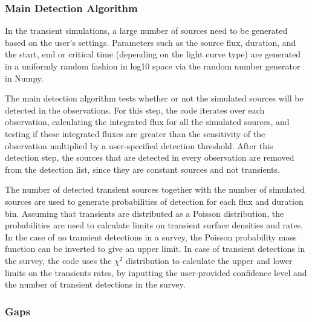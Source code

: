 \documentclass[12pt]{article}
\begin{document}
\subsubsection{Main Detection Algorithm}

In the transient simulations, a large number of sources need to be generated based on the user's settings. Parameters such as the source flux, duration, and the start, end or critical time (depending on the light curve type) are generated in a uniformly random fashion in log10 space via the random number generator in Numpy. 

The main detection algorithm tests whether or not the simulated sources will be detected in the observations. For this step, the code iterates over each observation, calculating the integrated flux for all the simulated sources, and testing if these integrated fluxes are greater than the sensitivity of the observation multiplied by a user-specified detection threshold. After this detection step, the sources that are detected in every observation are removed from the detection list, since they are constant sources and not transients. 

The number of detected transient sources together with the number of simulated sources are used to generate probabilities of detection for each flux and duration bin. Assuming that transients are distributed as a Poisson distribution, the probabilities are used to calculate limits on transient surface densities and rates. In the case of no transient detections in a survey, the Poisson probability mass function can be inverted to give an upper limit. In case of transient detections in the survey, the code uses the $\chi^2$ distribution \citep{12005udd3.inbook.....JKK} to calculate the upper and lower limits on the transients rates, by inputting the user-provided confidence level and the number of transient detections in the survey. 



\subsubsection{Gaps}
\end{document}
